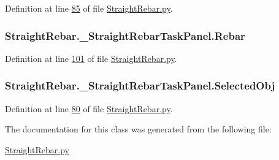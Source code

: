 Definition at line \hyperlink{StraightRebar_8py_source_l00085}{85} of file \hyperlink{StraightRebar_8py_source}{Straight\+Rebar.\+py}.

\subsubsection[{\texorpdfstring{Rebar}{Rebar}}]{\setlength{\rightskip}{0pt plus 5cm}Straight\+Rebar.\+\_\+\+Straight\+Rebar\+Task\+Panel.\+Rebar}\hypertarget{classStraightRebar_1_1__StraightRebarTaskPanel_a23fe17475277eae59cbed538f0f183cb}{}\label{classStraightRebar_1_1__StraightRebarTaskPanel_a23fe17475277eae59cbed538f0f183cb}


Definition at line \hyperlink{StraightRebar_8py_source_l00101}{101} of file \hyperlink{StraightRebar_8py_source}{Straight\+Rebar.\+py}.

\subsubsection[{\texorpdfstring{Selected\+Obj}{SelectedObj}}]{\setlength{\rightskip}{0pt plus 5cm}Straight\+Rebar.\+\_\+\+Straight\+Rebar\+Task\+Panel.\+Selected\+Obj}\hypertarget{classStraightRebar_1_1__StraightRebarTaskPanel_a4bdbe85e1cc468f34a907db99faebe85}{}\label{classStraightRebar_1_1__StraightRebarTaskPanel_a4bdbe85e1cc468f34a907db99faebe85}


Definition at line \hyperlink{StraightRebar_8py_source_l00080}{80} of file \hyperlink{StraightRebar_8py_source}{Straight\+Rebar.\+py}.



The documentation for this class was generated from the following file\+:\begin{DoxyCompactItemize}
\item 
\hyperlink{StraightRebar_8py}{Straight\+Rebar.\+py}\end{DoxyCompactItemize}
